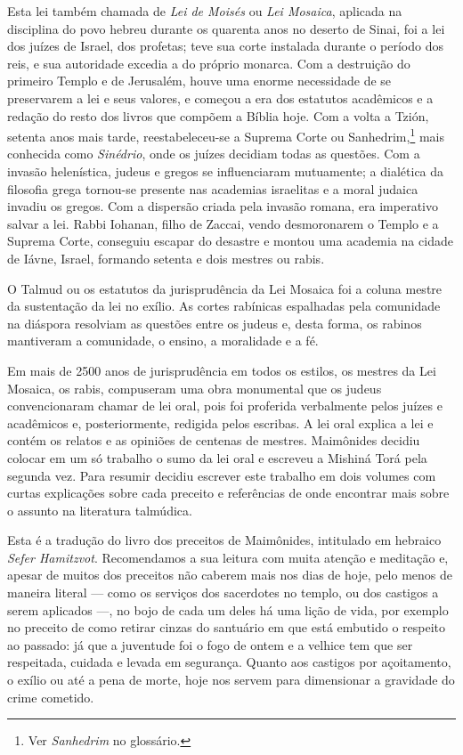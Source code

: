 Esta lei também chamada de \emph{Lei de Moisés} ou \emph{Lei Mosaica}, aplicada na disciplina do povo hebreu durante os quarenta anos no deserto de Sinai,
foi a lei dos juízes de Israel, dos profetas; teve sua corte instalada
durante o período dos reis,
e sua autoridade excedia a do próprio monarca. Com a destruição do
primeiro Templo e de Jerusalém, houve uma enorme necessidade de se
preservarem a lei e seus valores, e começou a era dos estatutos
acadêmicos e a redação do resto dos livros que compõem a Bíblia hoje.
Com a volta a Tzión, setenta anos mais tarde, reestabeleceu-se a Suprema
Corte ou Sanhedrim,\footnote{Ver \emph{Sanhedrim} no glossário.} mais conhecida como \emph{Sinédrio}, onde os juízes
decidiam todas as questões. Com a invasão helenística, judeus e gregos
se influenciaram mutuamente; a dialética da filosofia grega tornou-se
presente nas academias israelitas e a moral judaica invadiu os gregos.
Com a dispersão criada pela invasão romana, era imperativo salvar a lei.
Rabbi Iohanan, filho de Zaccai, vendo desmoronarem o Templo e a Suprema
Corte, conseguiu escapar do desastre e montou uma academia na cidade de Iávne,
Israel, formando setenta e dois mestres ou rabis.

O Talmud ou os estatutos da jurisprudência da Lei Mosaica foi a coluna
mestre da sustentação da lei no exílio. As cortes rabínicas espalhadas
pela comunidade na diáspora resolviam as questões entre os judeus e,
desta forma, os rabinos mantiveram a comunidade, o ensino, a moralidade
e a fé.

Em mais de 2500 anos de jurisprudência em todos os estilos, os mestres
da Lei Mosaica, os rabis, compuseram uma obra monumental que os judeus
convencionaram chamar de lei oral, pois foi proferida verbalmente
pelos juízes e acadêmicos e, posteriormente, redigida pelos escribas. A
lei oral explica a lei e contém os relatos e as opiniões de centenas de
mestres. Maimônides decidiu colocar em um só trabalho o sumo da lei oral e
escreveu a Mishiná Torá pela segunda vez.
Para resumir decidiu escrever este trabalho em dois volumes com curtas
explicações sobre cada preceito e referências de onde encontrar mais
sobre o assunto na literatura talmúdica.

Esta é a tradução do livro dos preceitos de Maimônides, intitulado em
hebraico \emph{Sefer Hamitzvot}. Recomendamos a sua leitura com muita
atenção e meditação e, apesar de muitos dos preceitos não caberem mais
nos dias de hoje, pelo menos de maneira literal --- como os serviços dos
sacerdotes no templo, ou dos castigos a serem aplicados ---, no bojo de
cada um deles há uma lição de vida, por exemplo no preceito de como retirar
cinzas do santuário em que está embutido o respeito ao passado: já que a
juventude foi o fogo de ontem e a velhice tem que ser respeitada,
cuidada e levada em segurança. Quanto aos castigos por açoitamento, o
exílio ou até a pena de morte, hoje nos servem para dimensionar a
gravidade do crime cometido.


